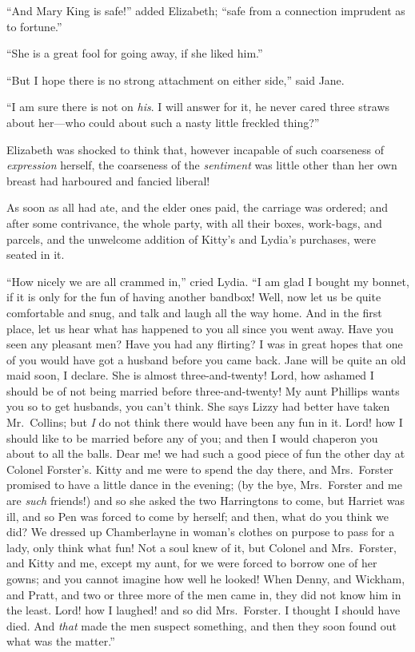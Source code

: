 ``And Mary King is safe!'' added Elizabeth; ``safe from a
connection imprudent as to fortune.''

``She is a great fool for going away, if she liked him.''

``But I hope there is no strong attachment on either side,''
said Jane.

``I am sure there is not on \emph{his}.  I will answer for it, he never
cared three straws about her---who could about such a nasty
little freckled thing?''

Elizabeth was shocked to think that, however incapable of
such coarseness of \emph{expression} herself, the coarseness of the
\emph{sentiment} was little other than her own breast had harboured
and fancied liberal!

As soon as all had ate, and the elder ones paid, the carriage was
ordered; and after some contrivance, the whole party, with all
their boxes, work-bags, and parcels, and the unwelcome addition
of Kitty's and Lydia's purchases, were seated in it.

``How nicely we are all crammed in,'' cried Lydia.  ``I am glad I
bought my bonnet, if it is only for the fun of having another
bandbox!  Well, now let us be quite comfortable and snug, and
talk and laugh all the way home.  And in the first place, let
us hear what has happened to you all since you went away.  Have
you seen any pleasant men?  Have you had any flirting?  I was
in great hopes that one of you would have got a husband before
you came back.  Jane will be quite an old maid soon, I declare.
She is almost three-and-twenty!  Lord, how ashamed I should be of
not being married before three-and-twenty!  My aunt Phillips wants
you so to get husbands, you can't think.  She says Lizzy had
better have taken Mr.\ Collins; but \emph{I} do not think there would
have been any fun in it.  Lord! how I should like to be married
before any of you; and then I would chaperon you about to all
the balls.  Dear me! we had such a good piece of fun the other
day at Colonel Forster's.  Kitty and me were to spend the day
there, and Mrs.\ Forster promised to have a little dance in the
evening; (by the bye, Mrs.\ Forster and me are \emph{such} friends!) and
so she asked the two Harringtons to come, but Harriet was ill,
and so Pen was forced to come by herself; and then, what do you
think we did?  We dressed up Chamberlayne in woman's clothes on
purpose to pass for a lady, only think what fun!  Not a soul
knew of it, but Colonel and Mrs.\ Forster, and Kitty and me,
except my aunt, for we were forced to borrow one of her gowns;
and you cannot imagine how well he looked!  When Denny, and
Wickham, and Pratt, and two or three more of the men came in,
they did not know him in the least.  Lord! how I laughed! and
so did Mrs.\ Forster.  I thought I should have died.  And \emph{that}
made the men suspect something, and then they soon found out
what was the matter.''

